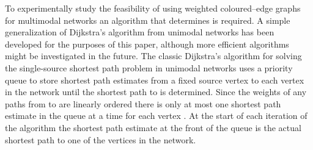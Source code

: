 \documentclass[preprint,authoryear,12pt]{elsarticle}
\begin{document}
To experimentally study the feasibility of using weighted coloured--edge graphs
for multimodal networks an algorithm that determines 
is required.
A simple generalization of Dijkstra's algorithm from unimodal networks
has been developed for the purposes of this paper,
although more efficient algorithms might be investigated in the future.
The classic Dijkstra's algorithm for solving the single-source shortest
path problem in unimodal networks uses a priority queue  to store
shortest path estimates from a fixed source vertex  to each vertex 
in the network until the shortest path to  is determined.
Since the weights of any paths  from  to  are linearly ordered
there is only at most one shortest path estimate in the queue at a time for each
vertex .
At the start of each iteration of the algorithm the shortest path estimate
at the front of the queue is the actual shortest path to one of the vertices
in the network.
\end{document}
